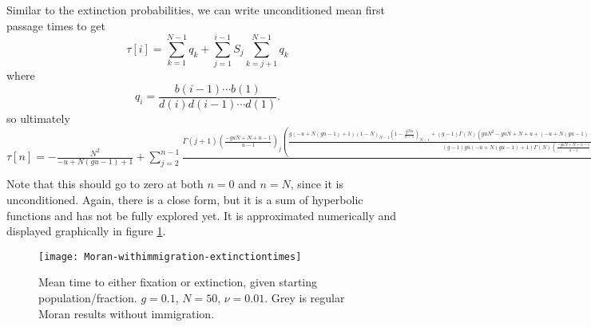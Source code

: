 Similar to the extinction probabilities, we can write unconditioned mean first passage times to get
\begin{equation}
\tau[i] = \sum_{k=1}^{N-1}q_k + \sum_{j=1}^{i-1}S_{j}\sum_{k=j+1}^{N-1}q_k
\end{equation}
where
\begin{equation*}
q_i = \frac{b(i-1)\cdots b(1)}{d(i)d(i-1)\cdots d(1)}. 
\end{equation*}
so ultimately
$\tau[n]=-\frac{N^2}{-u+N (g u-1)+1}+\sum _{j=2}^{n-1} \frac{\Gamma (j+1) \left(\frac{-g u N+N+u-1}{u-1}\right)_j \left(\frac{g (-u+N (g u-1)+1) (1-N)_{N-1} \left(1-\frac{g N u}{u-1}\right)_{N-1}+(g-1) \Gamma (N) \left(g u N^2-g u N+N+u+(-u+N (g u-1)+1) \, _2F_1\left(-N,-\frac{g N u}{u-1};\frac{-g u N+N+u-1}{u-1};1\right)-1\right) \left(\frac{-g u N+N+u-1}{u-1}\right)_{N-1}}{(g-1) g u (-u+N (g u-1)+1) \Gamma (N) \left(\frac{-g u N+N+u-1}{u-1}\right)_{N-1}}-\frac{g N^2 u (-u+N (g u-1)+1) \, _3F_2\left(1,j-N+1,\frac{u j}{u-1}-\frac{j}{u-1}+\frac{u}{u-1}-\frac{g N u}{u-1}-\frac{1}{u-1};j+2,\frac{u j}{u-1}-\frac{j}{u-1}+\frac{2 u}{u-1}+\frac{N}{u-1}-\frac{g N u}{u-1}-\frac{2}{u-1};1\right) (1-N)_j \left(1-\frac{g N u}{u-1}\right)_j-(j+1) (-g u N+N+j (u-1)+u-1) \Gamma (j+1) \left(g u N^2-g u N+N+u+(-u+N (g u-1)+1) \, _2F_1\left(-N,-\frac{g N u}{u-1};\frac{-g u N+N+u-1}{u-1};1\right)-1\right) \left(\frac{-g u N+N+u-1}{u-1}\right)_j}{g (j+1) u (-u+N (g u-1)+1) (-u j+j-u+N (g u-1)+1) \Gamma (j+1) \left(\frac{-g u N+N+u-1}{u-1}\right)_j}\right)}{(1-N)_j \left(1-\frac{g N u}{u-1}\right)_j}+\frac{g (-u+N (g u-1)+1) (1-N)_{N-1} \left(1-\frac{g N u}{u-1}\right)_{N-1}+(g-1) \Gamma (N) \left(g u N^2-g u N+N+u+(-u+N (g u-1)+1) \, _2F_1\left(-N,-\frac{g N u}{u-1};\frac{-g u N+N+u-1}{u-1};1\right)-1\right) \left(\frac{-g u N+N+u-1}{u-1}\right)_{N-1}}{(g-1) g u (-u+N (g u-1)+1) \Gamma (N) \left(\frac{-g u N+N+u-1}{u-1}\right)_{N-1}}+\frac{(-g u N+N+u-1) \left(g (-u+N (g u-1)+1) (1-N)_{N-1} \left(1-\frac{g N u}{u-1}\right)_{N-1}+(g-1) \Gamma (N) \left(g u N^2-g u N+N+u+(-u+N (g u-1)+1) \, _2F_1\left(-N,-\frac{g N u}{u-1};\frac{-g u N+N+u-1}{u-1};1\right)-1\right) \left(\frac{-g u N+N+u-1}{u-1}\right)_{N-1}\right)}{(g-1) g (N-1) u ((g N-1) u+1) (-u+N (g u-1)+1) \Gamma (N) \left(\frac{-g u N+N+u-1}{u-1}\right)_{N-1}}$
Note that this should go to zero at both $n=0$ and $n=N$, since it is unconditioned. 
Again, there is a close form, but it is a sum of hyperbolic functions and has not be fully explored yet. 
It is approximated numerically and displayed graphically in figure \ref{extntimefig}. 
\begin{figure}[ht]
	\centering
	\texttt{[image: Moran-withimmigration-extinctiontimes]}
	\caption{Mean time to either fixation or extinction, given starting population/fraction. $g=0.1$, $N=50$, $\nu=0.01$. Grey is regular Moran results without immigration. } \label{extntimefig}
\end{figure}

